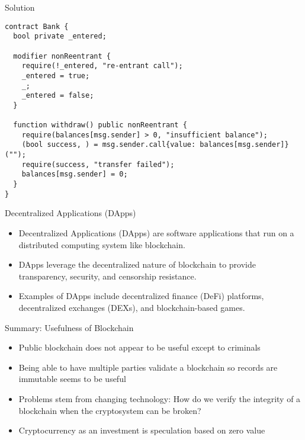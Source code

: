 \begin{frame}[fragile]{Solution}
\begin{lstlisting}
contract Bank {
  bool private _entered;

  modifier nonReentrant {
    require(!_entered, "re-entrant call");
    _entered = true;
    _;
    _entered = false;
  }

  function withdraw() public nonReentrant { 
    require(balances[msg.sender] > 0, "insufficient balance");
    (bool success, ) = msg.sender.call{value: balances[msg.sender]}("");
    require(success, "transfer failed");
    balances[msg.sender] = 0;
  }
}
\end{lstlisting}
\end{frame}

\begin{frame}{Decentralized Applications (DApps)}
    \begin{itemize}
        \item Decentralized Applications (DApps) are software applications that run on a distributed computing system like blockchain.
        \item DApps leverage the decentralized nature of blockchain to provide transparency, security, and censorship resistance.
        \item Examples of DApps include decentralized finance (DeFi) platforms, decentralized exchanges (DEXs), and blockchain-based games.
    \end{itemize}
\end{frame}

\begin{frame}{Summary: Usefulness of Blockchain}
    \begin{itemize}
        \item Public blockchain does not appear to be useful except to criminals
        \item Being able to have multiple parties validate a blockchain so records are immutable seems to be useful
        \item Problems stem from changing technology: How do we verify the integrity of a blockchain when the cryptosystem can be broken?
        \item Cryptocurrency as an investment is speculation based on zero value
    \end{itemize}
\end{frame}

 

